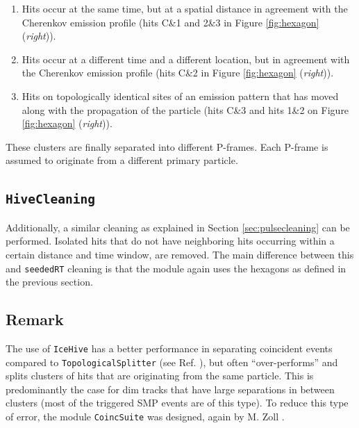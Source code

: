 \vspace{2mm}
\begin{enumerate}
\item Hits occur at the same time, but at a spatial distance in agreement with the Cherenkov emission profile (hits C\&1 and 2\&3 in Figure \ref{fig:hexagon} (\textit{right})).
\item Hits occur at a different time and a different location, but in agreement with the Cherenkov emission profile (hits C\&2 in Figure \ref{fig:hexagon} (\textit{right})).
\item Hits on topologically identical sites of an emission pattern that has moved along with the propagation of the particle (hits C\&3 and hits 1\&2 on Figure \ref{fig:hexagon} (\textit{right})).
\end{enumerate}
\vspace{2mm}

\noindent These clusters are finally separated into different P-frames. Each P-frame is assumed to originate from a different primary particle.

\subsection{\texttt{HiveCleaning}}
Additionally, a similar cleaning as explained in Section \ref{sec:pulsecleaning} can be performed. Isolated hits that do not have neighboring hits occurring within a certain distance and time window, are removed. The main difference between this and \texttt{seededRT} cleaning is that the module again uses the hexagons as defined in the previous section.\\

\subsection{Remark}
\noindent The use of \texttt{IceHive} has a better performance in separating coincident events compared to \texttt{TopologicalSplitter} (see Ref. \cite{mzollthesis}), but often ``over-performs'' and splits clusters of hits that are originating from the same particle. This is predominantly the case for dim tracks that have large separations in between clusters (most of the triggered SMP events are of this type). To reduce this type of error, the module \texttt{CoincSuite}  was designed, again by M. Zoll \cite{mzollthesis}.

